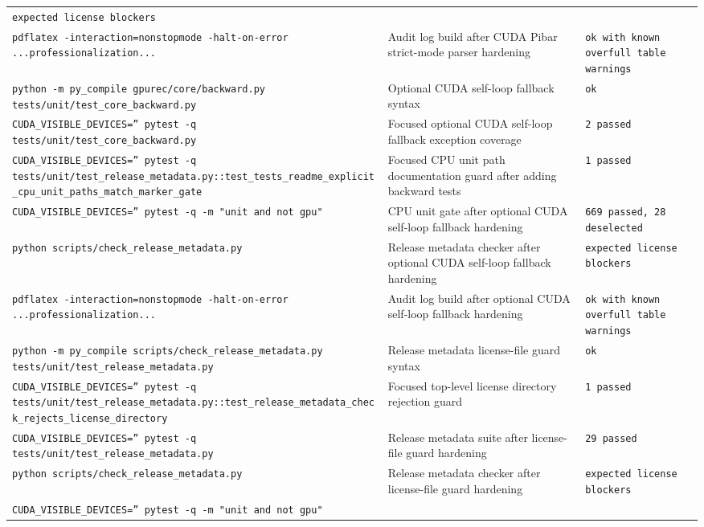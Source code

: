 \documentclass[11pt]{article}
\begin{document}
\begin{center}
\begin{tabular}{lll}
\texttt{expected license blockers} \\
\texttt{pdflatex -interaction=nonstopmode -halt-on-error ...professionalization...} &
Audit log build after CUDA Pibar strict-mode parser hardening &
\texttt{ok with known overfull table warnings} \\
\texttt{python -m py\_compile gpurec/core/backward.py tests/unit/test\_core\_backward.py} &
Optional CUDA self-loop fallback syntax &
\texttt{ok} \\
\texttt{CUDA\_VISIBLE\_DEVICES='' pytest -q tests/unit/test\_core\_backward.py} &
Focused optional CUDA self-loop fallback exception coverage &
\texttt{2 passed} \\
\texttt{CUDA\_VISIBLE\_DEVICES='' pytest -q tests/unit/test\_release\_metadata.py::test\_tests\_readme\_explicit\_cpu\_unit\_paths\_match\_marker\_gate} &
Focused CPU unit path documentation guard after adding backward tests &
\texttt{1 passed} \\
\texttt{CUDA\_VISIBLE\_DEVICES='' pytest -q -m "unit and not gpu"} &
CPU unit gate after optional CUDA self-loop fallback hardening &
\texttt{669 passed, 28 deselected} \\
\texttt{python scripts/check\_release\_metadata.py} &
Release metadata checker after optional CUDA self-loop fallback hardening &
\texttt{expected license blockers} \\
\texttt{pdflatex -interaction=nonstopmode -halt-on-error ...professionalization...} &
Audit log build after optional CUDA self-loop fallback hardening &
\texttt{ok with known overfull table warnings} \\
\texttt{python -m py\_compile scripts/check\_release\_metadata.py tests/unit/test\_release\_metadata.py} &
Release metadata license-file guard syntax &
\texttt{ok} \\
\texttt{CUDA\_VISIBLE\_DEVICES='' pytest -q tests/unit/test\_release\_metadata.py::test\_release\_metadata\_check\_rejects\_license\_directory} &
Focused top-level license directory rejection guard &
\texttt{1 passed} \\
\texttt{CUDA\_VISIBLE\_DEVICES='' pytest -q tests/unit/test\_release\_metadata.py} &
Release metadata suite after license-file guard hardening &
\texttt{29 passed} \\
\texttt{python scripts/check\_release\_metadata.py} &
Release metadata checker after license-file guard hardening &
\texttt{expected license blockers} \\
\texttt{CUDA\_VISIBLE\_DEVICES='' pytest -q -m "unit and not gpu"} &

\end{tabular}
\end{center}
\end{document}
